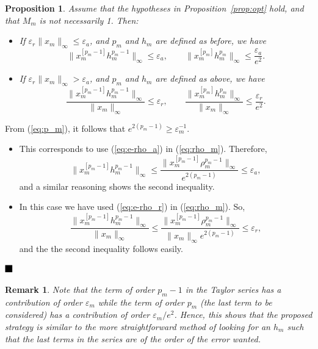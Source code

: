 \documentclass[12pt,twoside]{article}
\newtheorem{proposition}{Proposition}[section]
\newtheorem{remark}{Remark}[section]
\newcommand{\bproof}{\noindent {\bf Proof:} }
\newcommand{\eproof}{\hfill $\rule{3mm}{3mm}$}
\begin{document}
\begin{proposition}\label{prop:epo}
Assume that the hypotheses in Proposition~\ref{prop:opt} hold, and
that $M_m$ is not necessarily 1. Then:
\begin{itemize}
\item[{\bf 1.}]
 If $\varepsilon_r\|x_m\|_{\infty}\le\varepsilon_a$, and
 $p_m$ and $h_m$ are defined as before, we have
 \[
 \|x_m^{[p_m-1]}h_m^{p_m-1}\|_{\infty}\le\varepsilon_a,\qquad
 \|x_m^{[p_m]}h_m^{p_m}\|_{\infty}\le\frac{\varepsilon_a}{e^2}.
 \]

\item[{\bf 2.}]
 If $\varepsilon_r\|x_m\|_{\infty}>\varepsilon_a$, and
 $p_m$ and $h_m$ are defined as above, we have
 \[
 \frac{\|x_m^{[p_m-1]}h_m^{p_m-1}\|_{\infty}}{\|x_m\|_{\infty}}
   \le\varepsilon_r,\qquad
 \frac{\|x_m^{[p_m]}h_m^{p_m}\|_{\infty}}{\|x_m\|_{\infty}}
   \le\frac{\varepsilon_r}{e^2}.
 \]

\end{itemize}
\end{proposition}

\bproof
 From (\ref{eq:p_m}), it follows that
$e^{2(p_m-1)}\ge\varepsilon_m^{-1}$.
\begin{itemize}
\item[{\bf 1.}] This corresponds to use (\ref{eq:e-rho_a}) in
 (\ref{eq:rho_m}). Therefore,
 \[
 \|x_m^{[p_m-1]}h_m^{p_m-1}\|_{\infty}\le
 \frac{\|x_m^{[p_m-1]}\rho_m^{p_m-1}\|_{\infty}}{e^{2(p_m-1)}}
 \le\varepsilon_a,
 \]
 and a similar reasoning shows the second inequality.

\item[{\bf 2.}] In this case we have used (\ref{eq:e-rho_r}) in
 (\ref{eq:rho_m}). So,
 \[
 \frac{\|x_m^{[p_m-1]}h_m^{p_m-1}\|_{\infty}}{\|x_m\|_{\infty}}\le
 \frac{\|x_m^{[p_m-1]}\rho_m^{p_m-1}\|_{\infty}}{\|x_m\|_{\infty}e^{2(p_m-1)}}
 \le\varepsilon_r,
 \]
 and the the second inequality follows easily.
\end{itemize}
\eproof

\begin{remark}
Note that the term of order $p_m-1$ in the Taylor series has a
contribution of order $\varepsilon_m$ while the term of order $p_m$
(the last term to be considered) has a contribution of order
$\varepsilon_m/e^2$. Hence, this shows that the proposed strategy is
similar to the more straightforward method of looking for an $h_m$
such that the last terms in the series are of the order of the error
wanted.
\end{remark}
\end{document}
